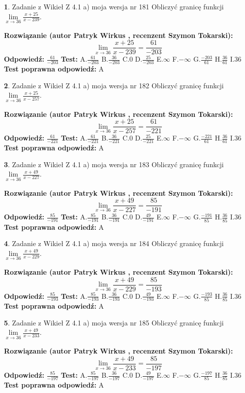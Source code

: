 \documentclass[12pt, a4paper]{article}
\theoremstyle{definition} %
\newtheorem{zad}{}
\newcommand{\zadStart}[1]{\begin{zad}#1\newline}
\newcommand{\zadStop}{\end{zad}}
\newcommand{\rozwStart}[2]{\noindent \textbf{Rozwiązanie (autor #1 , recenzent #2): }\newline}
\newcommand{\rozwStop}{\newline}
\newcommand{\odpStart}{\noindent \textbf{Odpowiedź:}\newline}
\newcommand{\odpStop}{\newline}
\newcommand{\testStart}{\noindent \textbf{Test:}\newline}
\newcommand{\testStop}{\newline}
\newcommand{\kluczStart}{\noindent \textbf{Test poprawna odpowiedź:}\newline}
\newcommand{\kluczStop}{\newline}
\begin{document}
\zadStart{Zadanie z Wikieł Z 4.1 a) moja wersja nr 181}
Obliczyć granicę funkcji $\lim\limits_{x\to36}\frac{x+25}{x-239}$.
\zadStop
\rozwStart{Patryk Wirkus}{Szymon Tokarski}
$$\lim\limits_{x\to36}\frac{x+25}{x-239} = \frac{61}{-203}$$
\rozwStop
\odpStart
$\frac{61}{-203}$
\odpStop
\testStart
A.$\frac{61}{-203}$
B.$\frac{36}{-203}$
C.$0$
D.$\frac{25}{-203}$
E.$\infty$
F.$-\infty$
G.$\frac{-203}{61}$
H.$\frac{36}{61}$
I.$36$
\testStop
\kluczStart
A
\kluczStop



\zadStart{Zadanie z Wikieł Z 4.1 a) moja wersja nr 182}
Obliczyć granicę funkcji $\lim\limits_{x\to36}\frac{x+25}{x-257}$.
\zadStop
\rozwStart{Patryk Wirkus}{Szymon Tokarski}
$$\lim\limits_{x\to36}\frac{x+25}{x-257} = \frac{61}{-221}$$
\rozwStop
\odpStart
$\frac{61}{-221}$
\odpStop
\testStart
A.$\frac{61}{-221}$
B.$\frac{36}{-221}$
C.$0$
D.$\frac{25}{-221}$
E.$\infty$
F.$-\infty$
G.$\frac{-221}{61}$
H.$\frac{36}{61}$
I.$36$
\testStop
\kluczStart
A
\kluczStop



\zadStart{Zadanie z Wikieł Z 4.1 a) moja wersja nr 183}
Obliczyć granicę funkcji $\lim\limits_{x\to36}\frac{x+49}{x-227}$.
\zadStop
\rozwStart{Patryk Wirkus}{Szymon Tokarski}
$$\lim\limits_{x\to36}\frac{x+49}{x-227} = \frac{85}{-191}$$
\rozwStop
\odpStart
$\frac{85}{-191}$
\odpStop
\testStart
A.$\frac{85}{-191}$
B.$\frac{36}{-191}$
C.$0$
D.$\frac{49}{-191}$
E.$\infty$
F.$-\infty$
G.$\frac{-191}{85}$
H.$\frac{36}{85}$
I.$36$
\testStop
\kluczStart
A
\kluczStop



\zadStart{Zadanie z Wikieł Z 4.1 a) moja wersja nr 184}
Obliczyć granicę funkcji $\lim\limits_{x\to36}\frac{x+49}{x-229}$.
\zadStop
\rozwStart{Patryk Wirkus}{Szymon Tokarski}
$$\lim\limits_{x\to36}\frac{x+49}{x-229} = \frac{85}{-193}$$
\rozwStop
\odpStart
$\frac{85}{-193}$
\odpStop
\testStart
A.$\frac{85}{-193}$
B.$\frac{36}{-193}$
C.$0$
D.$\frac{49}{-193}$
E.$\infty$
F.$-\infty$
G.$\frac{-193}{85}$
H.$\frac{36}{85}$
I.$36$
\testStop
\kluczStart
A
\kluczStop



\zadStart{Zadanie z Wikieł Z 4.1 a) moja wersja nr 185}
Obliczyć granicę funkcji $\lim\limits_{x\to36}\frac{x+49}{x-233}$.
\zadStop
\rozwStart{Patryk Wirkus}{Szymon Tokarski}
$$\lim\limits_{x\to36}\frac{x+49}{x-233} = \frac{85}{-197}$$
\rozwStop
\odpStart
$\frac{85}{-197}$
\odpStop
\testStart
A.$\frac{85}{-197}$
B.$\frac{36}{-197}$
C.$0$
D.$\frac{49}{-197}$
E.$\infty$
F.$-\infty$
G.$\frac{-197}{85}$
H.$\frac{36}{85}$
I.$36$
\testStop
\kluczStart
A
\kluczStop
\end{document}
